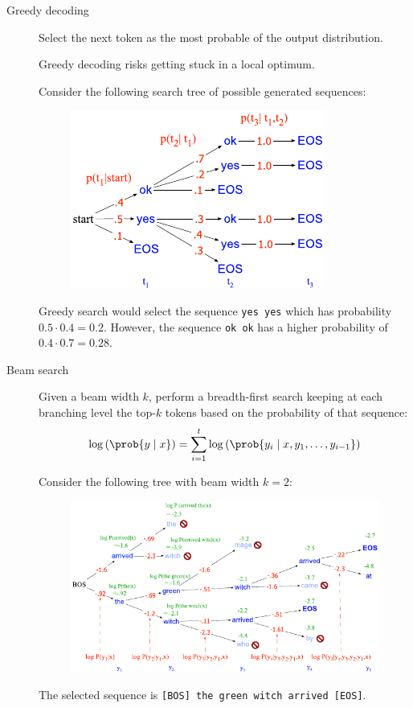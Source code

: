 \begin{description}
    \item[Greedy decoding] 
        Select the next token as the most probable of the output distribution.

        \begin{remark}
            Greedy decoding risks getting stuck in a local optimum.

            \indenttbox
            \begin{example}
                Consider the following search tree of possible generated sequences:
                \begin{figure}[H]
                    \centering
                    \includegraphics[width=0.3\linewidth]{./img/_greedy_decoding_local_minimum.pdf}
                \end{figure}

                Greedy search would select the sequence \texttt{yes yes} which has probability $0.5 \cdot 0.4 = 0.2$. However, the sequence \texttt{ok ok} has a higher probability of $0.4 \cdot 0.7 = 0.28$.
            \end{example}
        \end{remark}

    \item[Beam search] 
        Given a beam width $k$, perform a breadth-first search keeping at each branching level the top-$k$ tokens based on the probability of that sequence:
        \[ \log\left( \prob{y \mid x} \right) = \sum_{i=1}^{t} \log\left( \prob{ y_i \mid x, y_1, \dots, y_{i-1} } \right) \]

        \begin{example}
            Consider the following tree with beam width $k=2$:
            \begin{figure}[H]
                \centering
                \includegraphics[width=0.7\linewidth]{./img/_beam_search.pdf}
            \end{figure}
            The selected sequence is \texttt{[BOS] the green witch arrived [EOS]}.
        \end{example}


\end{description}
